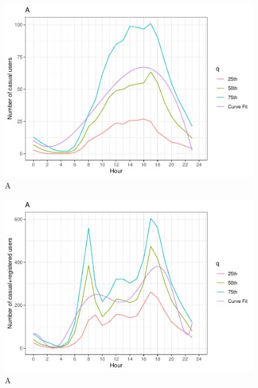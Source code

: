 \documentclass[
]{article}
\begin{document}
\begin{figure}
\centering
\includegraphics{LeastSquares_files/figure-latex/unnamed-chunk-14-1.pdf}
\caption{A}
\end{figure}

\begin{figure}
\centering
\includegraphics{LeastSquares_files/figure-latex/unnamed-chunk-15-1.pdf}
\caption{A}
\end{figure}
\end{document}
